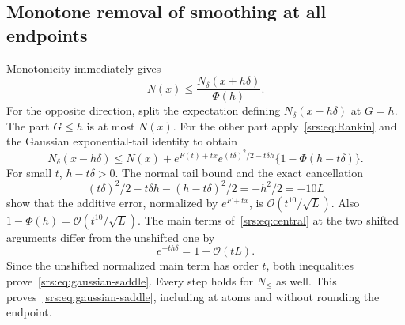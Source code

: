 \documentclass[11pt]{article}
\numberwithin{equation}{section}
\theoremstyle{remark}\newtheorem{remark}[theorem]{Remark}
\newcommand{\Oh}{\mathcal O}
\begin{document}
\subsection{Monotone removal of smoothing at all endpoints}
Monotonicity immediately gives
\begin{equation}
 N(x)\le\frac{N_\delta(x+h\delta)}{\Phi(h)}.\label{srs:eq:desmoothupper}
\end{equation}
For the opposite direction, split the expectation defining $N_\delta(x-h\delta)$ at $G=h$. The part $G\le h$ is at most $N(x)$. For the other part apply~\eqref{srs:eq:Rankin} and the Gaussian exponential-tail identity to obtain
\begin{equation}
 N_\delta(x-h\delta)\le N(x)+e^{F(t)+tx}
 e^{(t\delta)^2/2-t\delta h}\{1-\Phi(h-t\delta)\}.
 \label{srs:eq:desmoothlower}
\end{equation}
For small $t$, $h-t\delta>0$. The normal tail bound and the exact cancellation
\begin{equation}
 (t\delta)^2/2-t\delta h-(h-t\delta)^2/2=-h^2/2=-10L
\end{equation}
show that the additive error, normalized by $e^{F+tx}$, is
$\Oh(t^{10}/\sqrt L)$. Also $1-\Phi(h)=\Oh(t^{10}/\sqrt L)$.
The main terms of~\eqref{srs:eq:central} at the two shifted arguments differ from the unshifted one by
\begin{equation}
 e^{\pm th\delta}=1+\Oh(tL).
\end{equation}
Since the unshifted normalized main term has order $t$, both inequalities prove~\eqref{srs:eq:gaussian-saddle}. Every step holds for $N_{\le}$ as well. This proves~\eqref{srs:eq:gaussian-saddle}, including at atoms and without rounding the endpoint.
\end{document}
